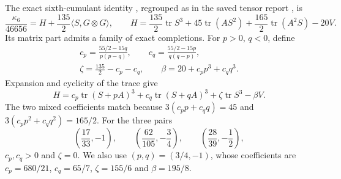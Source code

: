 \documentclass[11pt]{article}
\newcommand{\tr}{\operatorname{tr}}
\newcommand{\ip}[2]{\langle #1,#2\rangle}
\begin{document}
The exact sixth-cumulant identity \cite{HJM}, regrouped as in the saved tensor report \cite{tensor}, is
\begin{equation}\label{eq:cumulant-id}
 \frac{\kappa_6}{46656}=H+\frac{135}{2}\ip S{G\otimes G},
 \qquad
 H=\frac{135}{2}\tr S^3+45\tr(AS^2)
       +\frac{165}{2}\tr(A^2S)-20V.
\end{equation}
Its matrix part admits a family of exact completions. For $p>0$, $q<0$, define
\begin{equation}\label{eq:cube-coefficients}
\begin{gathered}
 c_p=\frac{55/2-15q}{p(p-q)},\qquad
 c_q=\frac{55/2-15p}{q(q-p)},\\
 \zeta=\frac{135}{2}-c_p-c_q,\qquad
 \beta=20+c_pp^3+c_qq^3.
\end{gathered}
\end{equation}
Expansion and cyclicity of the trace give
\begin{equation}\label{eq:cube-completion}
 H=c_p\tr(S+pA)^3+c_q\tr(S+qA)^3
   +\zeta\tr S^3-\beta V.
\end{equation}
The two mixed coefficients match because $3(c_pp+c_qq)=45$ and $3(c_pp^2+c_qq^2)=165/2$. For the three pairs
\begin{equation}\label{eq:cube-pairs}
 \left(\frac{17}{33},-1\right),\qquad
 \left(\frac{62}{105},-\frac34\right),\qquad
 \left(\frac{28}{39},-\frac12\right),
\end{equation}
$c_p,c_q>0$ and $\zeta=0$. We also use $(p,q)=(3/4,-1)$, whose coefficients are $c_p=680/21$, $c_q=65/7$, $\zeta=155/6$ and $\beta=195/8$.
\end{document}
